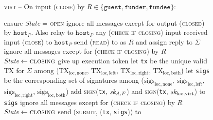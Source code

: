 \begin{figure}[H]
  \begin{processbox}{\textsc{virt} -- On input (\textsc{close}) by $R \in
  \{\texttt{guest}, \texttt{funder}, \texttt{fundee}\}$:}
    \begin{algorithmic}[1]
      \State {}
      \label{code:virtual-layer:close:output-guest-punished}
      \State ensure \textit{State} = \textsc{open}
       
      \label{code:virtual-layer:close:if-nested-host}
        \State ignore all messages except for output (\textsc{closed}) by
        $\texttt{host}_P$. Also relay to $\texttt{host}_P$ any (\textsc{check if
        closing}) input received
        \State input (\textsc{close}) to $\texttt{host}_P$
      \EndIf
      \State {}
      \State send (\textsc{read}) to \ledger as $R$ and assign reply to
      $\Sigma$
        \State ignore all messages except for (\textsc{check if closing}) by $R$
        \State $\textit{State} \gets \textsc{closing}$
        \State give up execution token 
      \EndIf
      \State let \texttt{tx} be the unique valid TX for $\Sigma$ among
      ($\mathrm{TX}_{\mathrm{loc}, \mathrm{none}}$,
      $\mathrm{TX}_{\mathrm{loc}, \mathrm{left}}$, $\mathrm{TX}_{\mathrm{loc},
      \mathrm{right}}$, $\mathrm{TX}_{\mathrm{loc}, \mathrm{both}}$)
      \label{code:virtual-layer:close:tx}
      \State let \texttt{sigs} be the corresponding set of signatures among
      ($\mathrm{sigs}_{\mathrm{loc}, \mathrm{none}}$,
      $\mathrm{sigs}_{\mathrm{loc}, \mathrm{left}}$,
      $\mathrm{sigs}_{\mathrm{loc}, \mathrm{right}}$,
      $\mathrm{sigs}_{\mathrm{loc}, \mathrm{both}}$)
      \State add \textsc{sign}(\texttt{tx}, $\textit{sk}_{A, F}$) and
      \textsc{sign}(\texttt{tx}, $\textit{sk}_{\mathrm{loc}, \mathrm{virt}}$) to
      \texttt{sigs} 
      \State ignore all messages except for (\textsc{check if closing}) by $R$
      \State $\textit{State} \gets \textsc{closing}$
      \State send (\textsc{submit}, (\texttt{tx}, \texttt{sigs})) to \ledger
    \end{algorithmic}
  \end{processbox}
  \caption{}
  \label{code:virtual-layer:close}
\end{figure}

